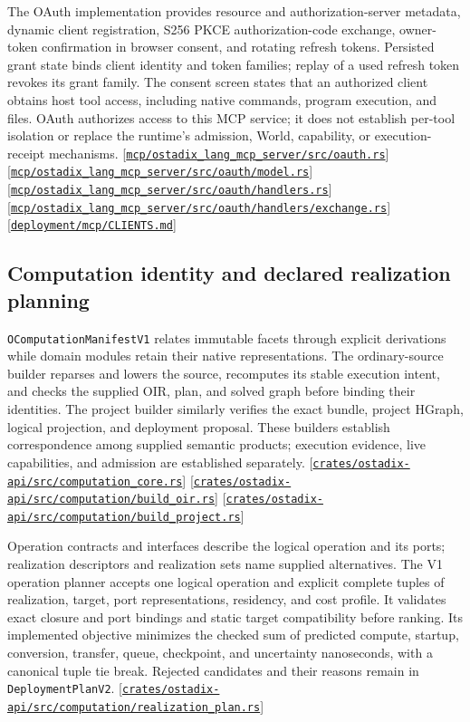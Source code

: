 \documentclass[11pt,oneside]{article}
\newcommand{\src}[1]{\textcolor{OSlate}{\scriptsize[\href{https://github.com/lostadi/OSTADIX/blob/c0b02c326b2329a95ba52447c7180bc93957cd57/#1}{\nolinkurl{#1}}]}\allowbreak}
\begin{document}
The OAuth implementation provides resource and authorization-server metadata,
dynamic client registration, S256 PKCE authorization-code exchange,
owner-token confirmation in browser consent, and rotating refresh tokens.
Persisted grant state binds client identity and token families; replay of a
used refresh token revokes its grant family. The consent screen states that
an authorized client obtains host tool access, including native commands,
program execution, and files. OAuth authorizes access to this MCP service;
it does not establish per-tool isolation or replace the runtime's admission,
World, capability, or execution-receipt mechanisms.
\src{mcp/ostadix_lang_mcp_server/src/oauth.rs}
\src{mcp/ostadix_lang_mcp_server/src/oauth/model.rs}
\src{mcp/ostadix_lang_mcp_server/src/oauth/handlers.rs}
\src{mcp/ostadix_lang_mcp_server/src/oauth/handlers/exchange.rs}
\src{deployment/mcp/CLIENTS.md}

\subsection{Computation identity and declared realization planning}
\label{sec:computation-planning}

\texttt{OComputationManifestV1} relates immutable facets through explicit
derivations while domain modules retain their native representations. The
ordinary-source builder reparses and lowers the source, recomputes its stable
execution intent, and checks the supplied OIR, plan, and solved graph before
binding their identities. The project builder similarly verifies the exact
bundle, project HGraph, logical projection, and deployment proposal. These
builders establish correspondence among supplied semantic products; execution
evidence, live capabilities, and admission are established separately.
\src{crates/ostadix-api/src/computation_core.rs}
\src{crates/ostadix-api/src/computation/build_oir.rs}
\src{crates/ostadix-api/src/computation/build_project.rs}

Operation contracts and interfaces describe the logical operation and its
ports; realization descriptors and realization sets name supplied alternatives.
The V1 operation planner accepts one logical operation and explicit complete
tuples of realization, target, port representations, residency, and cost
profile. It validates exact closure and port bindings and static target
compatibility before ranking. Its implemented objective minimizes the checked
sum of predicted compute, startup, conversion, transfer, queue, checkpoint,
and uncertainty nanoseconds, with a canonical tuple tie break. Rejected
candidates and their reasons remain in \texttt{DeploymentPlanV2}.
\src{crates/ostadix-api/src/computation/realization_plan.rs}
\end{document}
